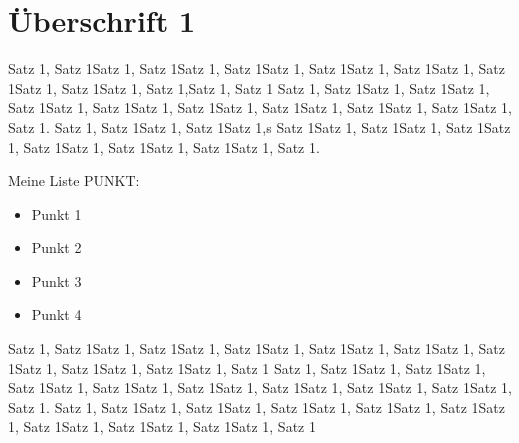 \section{Überschrift 1}

Satz 1, Satz 1Satz 1, Satz 1Satz 1, Satz 1Satz 1, Satz 1Satz 1, Satz 1Satz 1, Satz 1Satz 1, Satz 1Satz 1, Satz 1,Satz 1, Satz 1
Satz 1, Satz 1Satz 1, Satz 1Satz 1, Satz 1Satz 1, Satz 1Satz 1, Satz 1Satz 1, Satz 1Satz 1, Satz 1Satz 1, Satz 1Satz 1, Satz 1.
Satz 1, Satz 1Satz 1, Satz 1Satz 1,s Satz 1Satz 1, Satz 1Satz 1, Satz 1Satz 1, Satz 1Satz 1, Satz 1Satz 1, Satz 1Satz 1, Satz 1.

Meine Liste PUNKT:
\begin{itemize}
    \item Punkt 1
    \item Punkt 2
    \item Punkt 3
    \item Punkt 4
\end{itemize}

Satz 1, Satz 1Satz 1, Satz 1Satz 1, Satz 1Satz 1, Satz 1Satz 1, Satz 1Satz 1, Satz 1Satz 1, Satz 1Satz 1, Satz 1Satz 1, Satz 1
Satz 1, Satz 1Satz 1, Satz 1Satz 1, Satz 1Satz 1, Satz 1Satz 1, Satz 1Satz 1, Satz 1Satz 1, Satz 1Satz 1, Satz 1Satz 1, Satz 1.
Satz 1, Satz 1Satz 1, Satz 1Satz 1, Satz 1Satz 1, Satz 1Satz 1, Satz 1Satz 1, Satz 1Satz 1, Satz 1Satz 1, Satz 1Satz 1, Satz 1